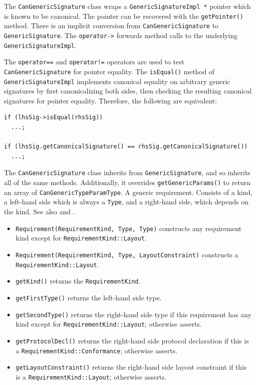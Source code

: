 \documentclass[../generics]{subfiles}
\begin{document}
The \texttt{CanGenericSignature} class wraps a \texttt{GenericSignatureImpl *} pointer which is known to be canonical. The pointer can be recovered with the \texttt{getPointer()} method. There is an implicit conversion from \texttt{CanGenericSignature} to \texttt{GenericSignature}. The \texttt{operator->} forwards method calls to the underlying \texttt{GenericSignatureImpl}.

The \texttt{operator==} and \texttt{operator!=} operators are used to test \texttt{CanGenericSignature} for pointer equality. The \texttt{isEqual()} method of \texttt{GenericSignatureImpl} implements canonical equality on arbitrary generic signatures by first canonicalizing both sides, then checking the resulting canonical signatures for pointer equality. Therefore, the following are equivalent:
\begin{Verbatim}
if (lhsSig->isEqual(rhsSig))
  ...;

if (lhsSig.getCanonicalSignature() == rhsSig.getCanonicalSignature())
  ...;
\end{Verbatim}
The \texttt{CanGenericSignature} class inherits from \texttt{GenericSignature}, and so inherits all of the same methods. Additionally, it overrides \texttt{getGenericParams()} to return an array of \texttt{CanGenericTypeParamType}.
A generic requirement. Consists of a kind, a left-hand side which is always a \texttt{Type}, and a right-hand side, which depends on the kind. See also  and .
\begin{itemize}
\item \texttt{Requirement(RequirementKind, Type, Type)} constructs any requirement kind except for \texttt{RequirementKind::Layout}.
\item \texttt{Requirement(RequirementKind, Type, LayoutConstraint)} constructs a\\ \texttt{RequirementKind::Layout}.
\item \texttt{getKind()} returns the \texttt{RequirementKind}.
\item \texttt{getFirstType()} returns the left-hand side type.
\item \texttt{getSecondType()} returns the right-hand side type if this requirement has any kind except for \texttt{RequirementKind::Layout}; otherwise asserts.
\item \texttt{getProtocolDecl()} returns the right-hand side protocol declaration if this is a \texttt{RequirementKind::Conformance}; otherwise asserts.
\item \texttt{getLayoutConstraint()} returns the right-hand side layout constraint if this is a \texttt{RequirementKind::Layout}; otherwise asserts.
\end{itemize}
\end{document}
